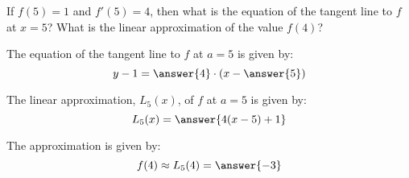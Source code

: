 \documentclass{ximera}
\author{Steven Gubkin}
\begin{document}
\begin{exercise}
If $f(5)=1$ and $f'(5) = 4$, then what is the equation of the tangent
line to $f$ at $x=5$?  What is the linear approximation of the value $f(4)$?

\begin{prompt}
The equation of the tangent line to $f$ at $a=5$ is given by:
 \[ y-1 = \answer{4}\cdot(x-\answer{5})\]
 
The linear approximation, $L_5(x)$, of $f$ at $a=5$ is given by:
 \[L_5(x) = \answer{4(x-5)+1}\]
  
 The approximation is given by:
\[ f(4) \approx L_5(4)= \answer{-3}\]
\end{prompt}



\end{exercise}
\end{document}
